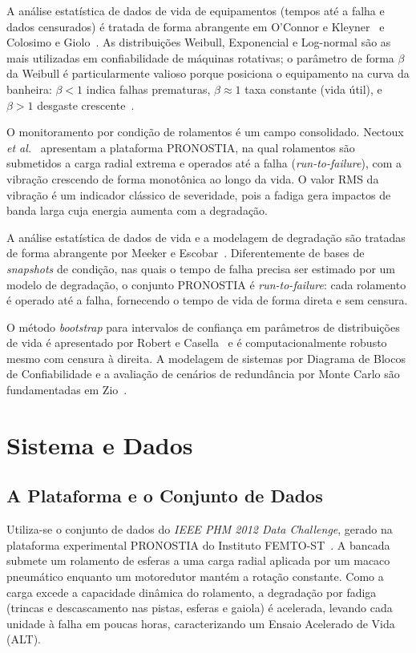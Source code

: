 \documentclass[conference]{IEEEtran}
\begin{document}
A análise estatística de dados de vida de equipamentos (tempos até a falha
e dados censurados) é tratada de forma abrangente em O'Connor e
Kleyner~\cite{oconnor2012} e Colosimo e Giolo~\cite{colosimo2006}. As
distribuições Weibull, Exponencial e Log-normal são as mais utilizadas em
confiabilidade de máquinas rotativas; o parâmetro de forma $\beta$ da Weibull é
particularmente valioso porque posiciona o equipamento na curva da banheira:
$\beta<1$ indica falhas prematuras, $\beta\approx 1$ taxa constante (vida útil),
e $\beta>1$ desgaste crescente~\cite{oconnor2012}.

O monitoramento por condição de rolamentos é um campo consolidado. Nectoux
\textit{et al.}~\cite{nectoux2012} apresentam a plataforma PRONOSTIA, na qual
rolamentos são submetidos a carga radial extrema e operados até a falha
(\textit{run-to-failure}), com a vibração crescendo de forma monotônica ao longo
da vida. O valor RMS da vibração é um indicador clássico de severidade, pois a
fadiga gera impactos de banda larga cuja energia aumenta com a degradação.

A análise estatística de dados de vida e a modelagem de degradação são tratadas
de forma abrangente por Meeker e Escobar~\cite{meeker1998}. Diferentemente de
bases de \textit{snapshots} de condição, nas quais o tempo de falha precisa
ser estimado por um modelo de degradação, o conjunto PRONOSTIA é
\textit{run-to-failure}: cada rolamento é operado até a falha, fornecendo o tempo
de vida de forma direta e sem censura.

O método \textit{bootstrap} para intervalos de confiança em parâmetros de
distribuições de vida é apresentado por Robert e Casella~\cite{robert2010} e
é computacionalmente robusto mesmo com censura à direita. A modelagem de sistemas
por Diagrama de Blocos de Confiabilidade e a avaliação de cenários de redundância
por Monte Carlo são fundamentadas em Zio~\cite{zio2013}.

\section{Sistema e Dados}
\label{sec:dados}

\subsection{A Plataforma e o Conjunto de Dados}
Utiliza-se o conjunto de dados do \textit{IEEE PHM 2012 Data Challenge}, gerado na
plataforma experimental PRONOSTIA do Instituto FEMTO-ST~\cite{nectoux2012}.
A bancada submete um rolamento de esferas a uma carga radial aplicada por um
macaco pneumático enquanto um motoredutor mantém a rotação constante. Como a carga
excede a capacidade dinâmica do rolamento, a degradação por fadiga (trincas e
descascamento nas pistas, esferas e gaiola) é acelerada, levando cada unidade
à falha em poucas horas, caracterizando um Ensaio Acelerado de Vida (ALT).
\end{document}
